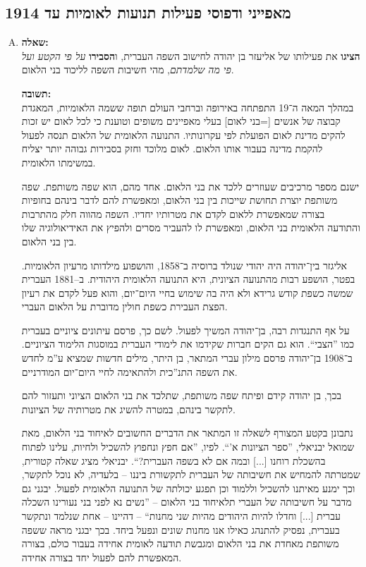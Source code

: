 \documentclass[a4paper]{article}
\newcommand\hl[1]   {#1}
\begin{document}
	\subsection{מאפייני ודפוסי פעילות תנועות לאומיות עד 1914}
		\begin{enumerate}[A.]
			\item \textbf{שאלה: }\\
			\textbf{הציגו} את פעילותו של אליעזר בן יהודה לחישוב השפה העברית, ו\textbf{הסבירו} \textit{על פי הקטע ועל פי מה שלמדתם}, מהי חשיבות השפה לליכוד בני הלאום. 
			
			\textbf{תשובה: }\\
			במהלך המאה ה־19 התפתחה באירופה וברחבי העולם תופה ששמה \hl{הלאומיות}, המאגדת קבוצה של אנשים [=\hl{בני לאום}] בעלי מאפיינים משופים וטוענת כי לכל לאום יש זכות להקים \hl{מדינת לאום} הפועלת לפי עקרונותיו. \hl{התנועה הלאומית} של הלאום תנסה לפעול להקמת מדינה בעבור אותו הלאום. לאום מלוכד וחזק בסבירות גבוהה יותר יצליח במשימתו הלאומית. 
			
			ישנם מספר מרכיבים שעוזרים ללכד את בני הלאום. אחד מהם, הוא \hl{שפה משותפת}. שפה משותפת יוצרת תחושת שייכות בין בני הלאום, ומאפשרת להם לדבר בינהם בחופיות בצורה שמאפשרת ללאום לקדם את מטרותיו יחדיו. השפה מהווה חלק מהתרבות והתודעה הלאומית בני הלאום, ומאפשרת לו להעביר מסרים ולהפיץ את האידיאולוגיה שלו בין בני הלאום. 
			
			\hl{אליגזר בין־יהודה} היה יהודי שנולד ברוסיה ב־1858, והושפוע מילדותו מרעיון הלאומיות. בפטר, הושפע רבות מ\hl{התנועה הציונית}, היא התנועה הלאומית היהודית. ב–1881 העברית שמשה כשפת קודש גרידא ולא היה בה שימוש בחיי היום־יום, והוא פעל לקדם את רעיון הפצת העבירת כשפת חולין מדוברת על הלאום העברי. 
			
			על אף התנגדות רבה, בן־יהודה המשיך לפעול. לשם כך, פרסם עיתונים ציוניים בעברית כמו ''הצבי``. הוא גם הקים חברות שקידמו את לימודי העברית במוסגות הלימוד הציוניים. ב־1908 בן־יהודה פרסם מילון עברי המתאר, בן היתר, מילים חדשות שמציא ע''מ לחדש את השפה התנ''כית ולהתאימה לחיי היום־יום המודרניים. 
			
			בכך, בן יהודה קידם ופיתח שפה משותפת, שתלכד את בני הלאום הציוני ותעזור להם לתקשר בינהם, במטרה להשיג את מטרותיה של הציונות. 
			
			נתבונן בקטע המצורף לשאלה זו המתאר את הדברים החשובים לאיחוד בני הלאום, מאת שמואל יבניאלי, ''ספר הציונות א'``. לפיו, ''אם חפץ ונחפוץ להשכיל ולחיות, עלינו לפתוח בהשכלת רוחנו [...] ובמה אם לא בשפה העברית?``. יבניאלי מציג שאלה קטורית, שמטרתה להמחיש את חשיבותה של העברית לתקשורת ביננו – בלעדיה, לא נוכל לתקשר, וכך ימנע מאיתנו להשכיל וללמוד וכן תפגע יכולתה של התנועה הלאומית לפעול. יבגני גם מדבר על חשיבותה של העברי תלאיחוד בני הלאום – ''נשים נא לפני בני נעורינו השכלה עברית [...] וחדלו להיות היהודים מהיות שני מחנות`` – דהיינו – אחת שנלמד ונתקשר בעברית, נפסיק להתנהג כאילו אנו מחנות שונים ונפעל ביחד. בכך יבגני מראה ששפה משותפת מאחדת את בני הלאום ומגבשת תודעה לאומית אחידה בעבור כולם, בצורה המאפשרת להם לפעול יחד בצורה אחידה. 
			

\end{enumerate}
\end{document}
